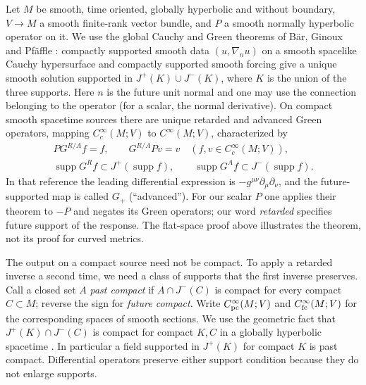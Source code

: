 Let $M$ be smooth, time oriented, globally hyperbolic and without boundary, $V\to M$ a smooth finite-rank vector bundle, and $P$ a smooth normally hyperbolic operator on it. We use the global Cauchy and Green theorems of B\"ar, Ginoux and Pf\"affle \cite[Thm.~3.2.11 and Cor.~3.4.3]{BGP}: compactly supported smooth data $(u,\nabla_nu)$ on a smooth spacelike Cauchy hypersurface and compactly supported smooth forcing give a unique smooth solution supported in $J^+(K)\cup J^-(K)$, where $K$ is the union of the three supports. Here $n$ is the future unit normal and one may use the connection belonging to the operator (for a scalar, the normal derivative). On compact smooth spacetime sources there are unique retarded and advanced Green operators, mapping $C_c^\infty(M;V)$ to $C^\infty(M;V)$, characterized by
\begin{equation}
 \begin{gathered}
  PG^{R/A} f=f,\qquad G^{R/A}P v=v \quad(f,v\in C_c^\infty(M;V)),\\
  \operatorname{supp}G^R f\subset J^+(\operatorname{supp}f),\qquad
  \operatorname{supp}G^A f\subset J^-(\operatorname{supp}f).
 \end{gathered}\label{f:green-identities}
\end{equation}
In that reference the leading differential expression is $-g^{\mu\nu}\partial_\mu\partial_\nu$, and the future-supported map is called $G_+$ (``advanced''). For our scalar $P$ one applies their theorem to $-P$ and negates its Green operators; our word \emph{retarded} specifies future support of the response. The flat-space proof above illustrates the theorem, not its proof for curved metrics.

The output on a compact source need not be compact. To apply a retarded inverse a second time, we need a class of supports that the first inverse preserves. Call a closed set $A$ \emph{past compact} if $A\cap J^-(C)$ is compact for every compact $C\subset M$; reverse the sign for \emph{future compact}. Write $C^\infty_{\rm pc}(M;V)$ and $C^\infty_{\rm fc}(M;V)$ for the corresponding spaces of smooth sections. We use the geometric fact that $J^+(K)\cap J^-(C)$ is compact for compact $K,C$ in a globally hyperbolic spacetime \cite[Lemma~A.5.7]{BGP}. In particular a field supported in $J^+(K)$ for compact $K$ is past compact. Differential operators preserve either support condition because they do not enlarge supports.

